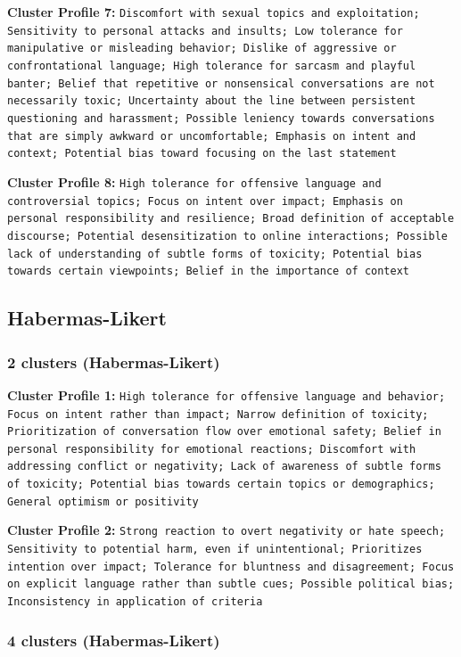 \documentclass[11pt]{article}
\begin{document}
\textbf{Cluster Profile 7:} \texttt{Discomfort with sexual topics and exploitation; Sensitivity to personal attacks and insults; Low tolerance for manipulative or misleading behavior; Dislike of aggressive or confrontational language; High tolerance for sarcasm and playful banter; Belief that repetitive or nonsensical conversations are not necessarily toxic; Uncertainty about the line between persistent questioning and harassment; Possible leniency towards conversations that are simply awkward or uncomfortable; Emphasis on intent and context; Potential bias toward focusing on the last statement}


\textbf{Cluster Profile 8:} \texttt{High tolerance for offensive language and controversial topics; Focus on intent over impact; Emphasis on personal responsibility and resilience; Broad definition of acceptable discourse; Potential desensitization to online interactions; Possible lack of understanding of subtle forms of toxicity; Potential bias towards certain viewpoints; Belief in the importance of context}


\subsection{Habermas-Likert}


\subsubsection{2 clusters (Habermas-Likert)}


\textbf{Cluster Profile 1:} \texttt{High tolerance for offensive language and behavior; Focus on intent rather than impact; Narrow definition of toxicity; Prioritization of conversation flow over emotional safety; Belief in personal responsibility for emotional reactions; Discomfort with addressing conflict or negativity; Lack of awareness of subtle forms of toxicity; Potential bias towards certain topics or demographics; General optimism or positivity}


\textbf{Cluster Profile 2:} \texttt{Strong reaction to overt negativity or hate speech; Sensitivity to potential harm, even if unintentional; Prioritizes intention over impact; Tolerance for bluntness and disagreement; Focus on explicit language rather than subtle cues; Possible political bias; Inconsistency in application of criteria}


\subsubsection{4 clusters (Habermas-Likert)}
\end{document}
